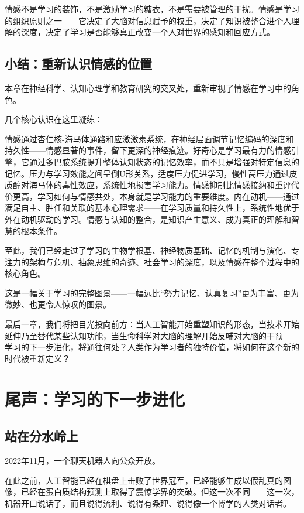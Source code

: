 \documentclass[11pt]{article}
\begin{document}
情感不是学习的装饰，不是激励学习的糖衣，不是需要被管理的干扰。情感是学习的组织原则之一——它决定了大脑对信息赋予的权重，决定了知识被整合进个人理解的深度，决定了学习是否能够真正改变一个人对世界的感知和回应方式。
\subsection{小结：重新认识情感的位置}
\label{sec:org470b841}

本章在神经科学、认知心理学和教育研究的交叉处，重新审视了情感在学习中的角色。

几个核心认识在这里凝练：

情感通过杏仁核-海马体通路和应激激素系统，在神经层面调节记忆编码的深度和持久性——情感显著的事件，留下更深的神经痕迹。好奇心是学习最有力的情感引擎，它通过多巴胺系统提升整体认知状态的记忆效率，而不只是增强对特定信息的记忆。压力与学习效能之间呈倒U形关系，适度压力促进学习，慢性高压力通过皮质醇对海马体的毒性效应，系统性地损害学习能力。情感抑制比情感接纳和重评代价更高，学习如何与情感共处，本身就是学习能力的重要维度。内在动机——通过满足自主、胜任和关联的基本心理需求——在学习质量和持久性上，系统性地优于外在动机驱动的学习。情感与认知的整合，是知识产生意义、成为真正的理解和智慧的根本条件。

至此，我们已经走过了学习的生物学根基、神经物质基础、记忆的机制与演化、专注力的架构与危机、抽象思维的奇迹、社会学习的深度，以及情感在整个过程中的核心角色。

这是一幅关于学习的完整图景——一幅远比“努力记忆、认真复习”更为丰富、更为微妙、也更令人惊叹的图景。

最后一章，我们将把目光投向前方：当人工智能开始重塑知识的形态，当技术开始延伸乃至替代某些认知功能，当生命科学对大脑的理解开始反哺对大脑的干预——学习的下一步进化，将通往何处？人类作为学习者的独特价值，将如何在这个新的时代被重新定义？
\section{尾声：学习的下一步进化}
\label{sec:org6f47ea5}

\subsection{站在分水岭上}
\label{sec:org190af87}

2022年11月，一个聊天机器人向公众开放。

在此之前，人工智能已经在棋盘上击败了世界冠军，已经能够生成以假乱真的图像，已经在蛋白质结构预测上取得了震惊学界的突破。但这一次不同——这一次，机器开口说话了，而且说得流利、说得有条理、说得像一个博学的人类对话者。
\end{document}
